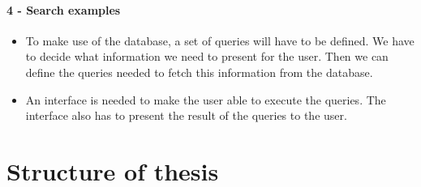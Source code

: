 \paragraph{4 - Search examples} 
\begin{itemize}
    \item To make use of the database, a set of queries will have to be defined. We have to decide what information we need to present for the user. Then we can define the queries needed to fetch this information from the database.
    \item An interface is needed to make the user able to execute the queries. The interface also has to present the result of the queries to the user.
\end{itemize}


\section{Structure of thesis}
\cleardoublepage